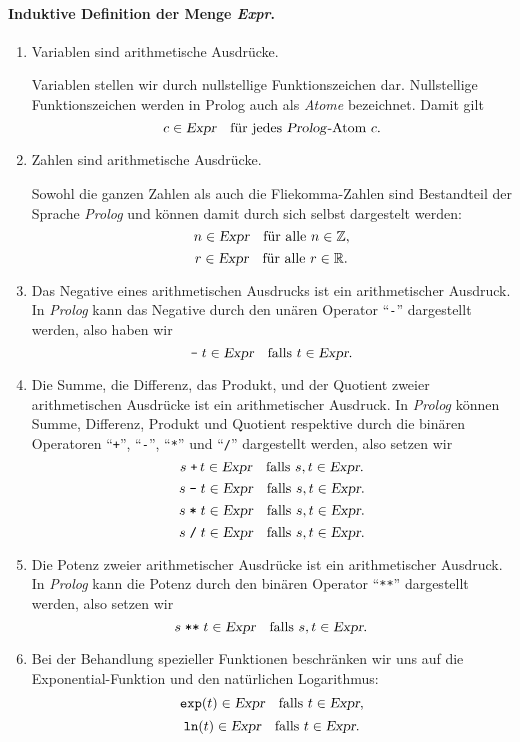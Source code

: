 \paragraph{Induktive Definition der Menge \textsl{Expr}.}
\begin{enumerate}
\item Variablen sind arithmetische Ausdr\"{u}cke.

      Variablen stellen wir durch nullstellige Funktionszeichen dar.
      Nullstellige Funktionszeichen werden in Prolog auch als \emph{Atome} bezeichnet.
      Damit gilt
      \[ c \in \textsl{Expr} \quad \mbox{f\"{u}r jedes \textsl{Prolog}-Atom $c$}. \]
\item Zahlen sind arithmetische Ausdr\"{u}cke.

      Sowohl die ganzen Zahlen als auch die Flie\3komma-Zahlen sind Bestandteil der Sprache
      \textsl{Prolog} und k\"{o}nnen damit durch sich selbst dargestelt werden:
      \[ n \in \textsl{Expr} \quad \mbox{f\"{u}r alle $n \in \mathbb{Z}$}, \]
      \[ r \in \textsl{Expr} \quad \mbox{f\"{u}r alle $r \in \mathbb{R}$}. \]
\item Das Negative eines arithmetischen Ausdrucks ist ein arithmetischer Ausdruck.
      In \textsl{Prolog} kann das Negative durch den un\"{a}ren Operator ``\texttt{-}'' dargestellt
      werden, also haben wir
      \[ \texttt{-}\; t \in \textsl{Expr} \quad \mbox{falls $t \in \textsl{Expr}$}. \]
\item Die Summe, die Differenz, das Produkt, und der Quotient zweier arithmetischen
      Ausdr\"{u}cke ist ein arithmetischer Ausdruck. 
      In \textsl{Prolog} k\"{o}nnen Summe, Differenz, Produkt und Quotient respektive
      durch die bin\"{a}ren Operatoren ``\texttt{+}'', ``\texttt{-}'', ``\texttt{*}'' und ``\texttt{/}'' 
      dargestellt werden, also setzen wir
      \[ s \;\texttt{+}\, t \in \textsl{Expr} \quad \mbox{falls $s,t \in \textsl{Expr}$}. \]
      \[ s \;\texttt{-}\; t \in \textsl{Expr} \quad \mbox{falls $s,t \in \textsl{Expr}$}. \]
      \[ s \;\texttt{*}\; t \in \textsl{Expr} \quad \mbox{falls $s,t \in \textsl{Expr}$}. \]
      \[ s \;\texttt{/}\; t \in \textsl{Expr} \quad \mbox{falls $s,t \in \textsl{Expr}$}. \]
\item Die Potenz zweier arithmetischer Ausdr\"{u}cke ist ein arithmetischer Ausdruck.
      In \textsl{Prolog} kann die Potenz durch den bin\"{a}ren Operator ``\texttt{**}'' dargestellt
      werden, also setzen wir
      \[ s \;\texttt{**}\; t \in \textsl{Expr} \quad \mbox{falls $s,t \in \textsl{Expr}$}. \]
\item Bei der Behandlung spezieller Funktionen beschr\"{a}nken wir uns auf die
      Exponential-Funktion und den nat\"{u}rlichen Logarithmus:
      \[ \texttt{exp}(t) \in \textsl{Expr}  \quad \mbox{falls $t \in \textsl{Expr}$}, \]
      \[ \texttt{ln}(t)  \in \textsl{Expr}  \quad \mbox{falls $t \in \textsl{Expr}$}. \]
\end{enumerate}

